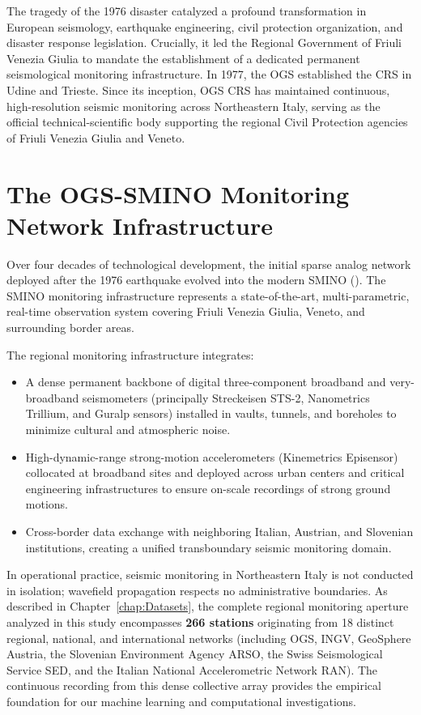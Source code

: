 The tragedy of the 1976 disaster catalyzed a profound transformation in European seismology, earthquake engineering, civil protection organization, and disaster response legislation. Crucially, it led the Regional Government of Friuli Venezia Giulia to mandate the establishment of a dedicated permanent seismological monitoring infrastructure. In 1977, the \acf{OGS} established the \acf{CRS} in Udine and Trieste. Since its inception, OGS CRS has maintained continuous, high-resolution seismic monitoring across Northeastern Italy, serving as the official technical-scientific body supporting the regional Civil Protection agencies of Friuli Venezia Giulia and Veneto.

\section{The OGS-SMINO Monitoring Network Infrastructure}
\label{sec:smino_network}

Over four decades of technological development, the initial sparse analog network deployed after the 1976 earthquake evolved into the modern \acf{SMINO} (\cite{SMINO}). The SMINO monitoring infrastructure represents a state-of-the-art, multi-parametric, real-time observation system covering Friuli Venezia Giulia, Veneto, and surrounding border areas.

The regional monitoring infrastructure integrates:
\begin{itemize}
  \item A dense permanent backbone of digital three-component broadband and very-broadband seismometers (principally Streckeisen STS-2, Nanometrics Trillium, and Guralp sensors) installed in vaults, tunnels, and boreholes to minimize cultural and atmospheric noise.
  \item High-dynamic-range strong-motion accelerometers (Kinemetrics Episensor) collocated at broadband sites and deployed across urban centers and critical engineering infrastructures to ensure on-scale recordings of strong ground motions.
  \item Cross-border data exchange with neighboring Italian, Austrian, and Slovenian institutions, creating a unified transboundary seismic monitoring domain.
\end{itemize}

In operational practice, seismic monitoring in Northeastern Italy is not conducted in isolation; wavefield propagation respects no administrative boundaries. As described in Chapter~\ref{chap:Datasets}, the complete regional monitoring aperture analyzed in this study encompasses \textbf{266 stations} originating from 18 distinct regional, national, and international networks (including OGS, \ac{INGV}, GeoSphere Austria, the Slovenian Environment Agency ARSO, the Swiss Seismological Service SED, and the Italian National Accelerometric Network RAN). The continuous recording from this dense collective array provides the empirical foundation for our machine learning and computational investigations.

